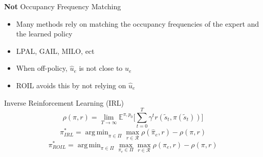 \documentclass[final,a0paper]{beamer}
\DeclareMathOperator*{\argmin}{arg\,min}
\begin{document}
\begin{frame}{}
\begin{columns}[t]
\begin{column}{0.3\linewidth}
    \begin{block}{\textbf{Not} Occupancy Frequency Matching}
        \begin{itemize}
            \item Many methods rely on matching the occupancy frequencies of the expert and the learned policy
            \item LPAL, GAIL, MILO, ect
            \item When off-policy, $\hat{u}_e$ is not close to $u_e$
            \item ROIL avoids this by not relying on $\hat{u}_e$
        \end{itemize}
    \end{block}

    \begin{block}{Inverse Reinforcement Learning (IRL)}
        \[
          \rho(\pi, r) = \lim_{T \to \infty} \mathbb{E}^{\pi, p_0} \lbrack \sum_{t=0}^{T} \gamma^t r(\tilde{s}_t, \pi(\tilde{s}_t)) \rbrack
        \]
        \[ 
          \pi^*_{IRL} = \argmin_{\pi \in \Pi} \max_{r \in \mathcal{R}} \rho(\hat{\pi}_e, r) - \rho(\pi, r)
        \]
        \[
          \pi^*_{ROIL} = \argmin_{\pi \in \Pi} \max_{\pi_e \in \Pi} \max_{r \in \mathcal{R}} \rho(\pi_e, r) - \rho(\pi, r)
        \]
    \end{block}

  \end{column}
  

\end{columns}
\end{frame}
\end{document}
